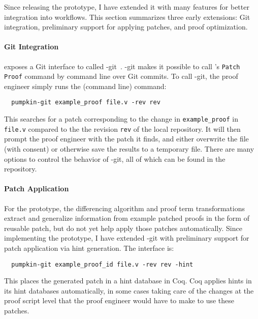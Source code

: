 Since releasing the \sysname prototype, I have extended it with many features
for better integration into  workflows.
This section summarizes three early extensions: Git integration, preliminary support for applying patches,
and proof optimization.

\paragraph{Git Integration} \sysnamelong exposes a Git interface to \sysname
called \sysname-git~\cite{pumpkin-git}.
\sysname-git makes it possible to call \sysname's \lstinline{Patch Proof} command by command line over Git commits.
To call \sysname-git, the proof engineer simply runs the (command line) command:

\begin{lstlisting}
  pumpkin-git example_proof file.v -rev rev
\end{lstlisting}
This searches for a patch corresponding to the change in \lstinline{example_proof} in \lstinline{file.v} compared to the the revision \lstinline{rev}
of the local repository. It will then prompt the proof engineer with the patch it finds, and either overwrite the file (with consent) 
or otherwise save the results to a temporary file. There are many options to control the behavior of \sysname-git,
all of which can be found in the repository.

\paragraph{Patch Application}
For the \sysname prototype, the differencing algorithm and proof term transformations extract and generalize information from example patched proofs
in the form of reusable patch, but do not yet help apply those patches automatically.
Since implementing the prototype, I have extended \sysname-git with preliminary support for patch application via hint generation.
The interface is: %

\begin{lstlisting}
  pumpkin-git example_proof_id file.v -rev rev -hint
\end{lstlisting}
This places the generated patch in a hint database in Coq.
Coq applies hints in its hint databases automatically, in some cases taking care of the changes at the proof script level
that the proof engineer would have to make to use these patches.

